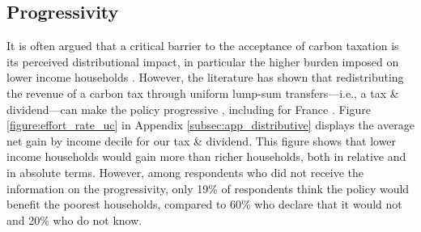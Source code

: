 \documentclass[12pt]{article} %
\begin{document}
\subsection{Progressivity\label{subsec:beliefs_progressivity}}
It is often argued that a critical barrier to the acceptance of carbon taxation is its perceived distributional impact, in particular the higher burden imposed on lower income households \citep{bristow_public_2010,brannlund_tax_2012,gevrek_public_2015}. However, the literature has shown that redistributing the revenue of a carbon tax through uniform lump-sum transfers---i.e., a tax \& dividend---can make the policy progressive \citep{west_williams_04,bento_distributional_2009,williams_initial_2015}, including for France \citep{bureau_distributional_2011,douenne_2020}. Figure \ref{figure:effort_rate_uc} in Appendix \ref{subsec:app_distributive} displays the average net gain by income decile for our tax \& dividend. This figure shows that lower income households would gain more than richer households, both in relative and in absolute terms. However, among respondents who did not receive the information on the progressivity, only 19\% of respondents think the policy would benefit the poorest households, compared to 60\% who declare that it would not and 20\% who do not know.


\end{document}
